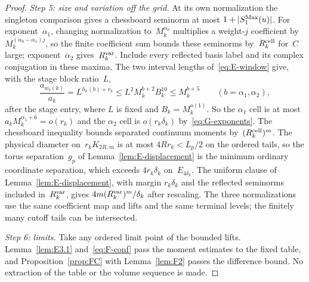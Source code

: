 \begin{proof}
\emph{Step 5: size and variation off the grid.} At its own normalization the singleton comparison gives a chessboard seminorm at most $1+|S_1^{\rm Max}(u)|$. For exponent~$\alpha_1$, changing normalization to~$M_k^{\alpha_0}$ multiplies a weight-$j$ coefficient by $M_k^{(\alpha_0-\alpha_1)j}$, so the finite coefficient sum bounds these seminorms by~$R^{\rm cell}_k$ for~$C$ large; exponent~$\alpha_2$ gives~$R^{\rm var}_k$. Include every reflected basis label and its complex conjugation in these maxima. The two interval lengths of~\eqref{eq:E-window} give, with the stage block ratio~$L$,
\begin{equation}\label{eq:G-root-sides}
\frac{a_{w_b(k)}}{a_k}=L^{h_k(b)+v_k}
\le L^2M_k^{b+2}B_k^{10}\le M_k^{b+5}
\qquad(b=\alpha_1,\alpha_2),
\end{equation}
after the stage entry, where $L$ is fixed and $B_k=M_k^{o(1)}$. So the $\alpha_1$ cell is at most $a_kM_k^{\alpha_1+6}=o(r_k)$ and the $\alpha_2$ cell is $o(r_k\delta_k)$ by~\eqref{eq:G-exponents}. The chessboard inequality bounds separated continuum moments by~$(R^{\rm cell}_k)^m$. The physical diameter on~$r_kK_{2R,m}$ is at most $4Rr_k<L_p/2$ on the ordered tails, so the torus separation~$g_p$ of Lemma~\ref{lem:E-displacement} is the minimum ordinary coordinate separation, which exceeds $4r_k\delta_k$ on~$E_{4\delta_k}$. The uniform clause of Lemma~\ref{lem:E-displacement}, with margin $r_k\delta_k$ and the reflected seminorms included in~$R^{\rm var}_k$, gives $4m(R^{\rm var}_k)^m/\delta_k$ after rescaling. The three normalizations use the same coefficient map and lifts and the same terminal levels; the finitely many cutoff tails can be intersected.

\emph{Step 6: limits.} Take any ordered limit point of the bounded lifts. Lemma~\ref{lem:E3.1} and~\eqref{eq:F-conf} pass the moment estimates to the fixed table, and Proposition~\ref{prop:FC} with Lemma~\ref{lem:F2} passes the difference bound. No extraction of the table or the volume sequence is made.
\end{proof}

